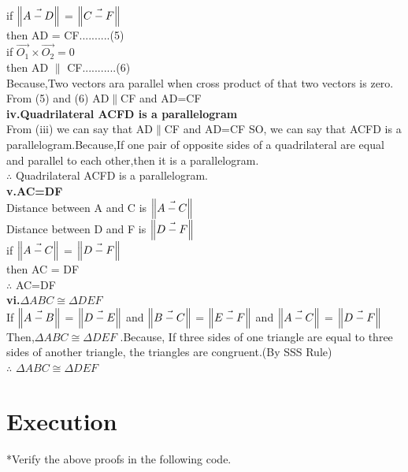 \documentclass[10pt, a4paper]{article}
\begin{document}
	if $\norm{\vec{A-D}}$ =  $\norm{\vec{C-F}}$\\
	then AD = CF..........(5)\\
	if $\vec{O_1} \times \vec{O_2}=0$\\
	then AD $\parallel$ CF...........(6)\\
	Because,Two vectors ara parallel when cross product of that two vectors is zero.\\
	From (5) and (6) AD$\parallel$CF and AD=CF \\
\textbf{iv.Quadrilateral ACFD is a parallelogram}\\
   From (iii) we can say that AD$\parallel$CF and AD=CF 
	SO, we can say that ACFD is a parallelogram.Because,If one pair of opposite sides of a quadrilateral are equal and parallel to each other,then it is a parallelogram.\\
	$\therefore$ Quadrilateral ACFD is a parallelogram.\\
\textbf{v.AC=DF}\\
    Distance between A and C is $\norm{\vec{A-C}}$\\
	Distance between D and F is $\norm{\vec{D-F}}$\\
	if $\norm{\vec{A-C}}$ =  $\norm{\vec{D-F}}$\\
	then AC = DF\\
	$\therefore$ AC=DF\\
\textbf{vi.$\Delta ABC \cong \Delta DEF$}  \\
If $\norm{\vec{A-B}}$ =  $\norm{\vec{D-E}}$ and $\norm{\vec{B-C}}$ =  $\norm{\vec{E-F}}$ and $\norm{\vec{A-C}}$ =  $\norm{\vec{D-F}}$\\
Then,$\Delta ABC \cong \Delta DEF$ .Because, If three sides of one triangle are equal to three sides of another triangle, the triangles are congruent.(By SSS Rule)\\
$\therefore$ $\Delta ABC \cong \Delta DEF$

\section{Execution}
*Verify the above proofs in the following code.\\

\end{document}
